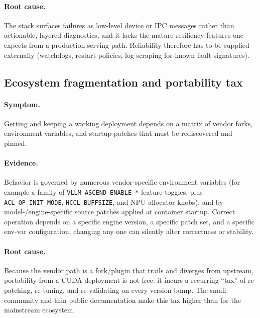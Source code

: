 \documentclass{article}
\newcommand{\code}[1]{\texttt{#1}}
\begin{document}
\paragraph{Root cause.} The stack surfaces failures as low-level device or IPC
messages rather than actionable, layered diagnostics, and it lacks the mature
resiliency features one expects from a production serving path. Reliability
therefore has to be supplied externally (watchdogs, restart policies, log scraping
for known fault signatures).

\subsection{Ecosystem fragmentation and portability tax}
\label{sec:ecosystem}
\paragraph{Symptom.} Getting and keeping a working deployment depends on a matrix
of vendor forks, environment variables, and startup patches that must be
rediscovered and pinned.

\paragraph{Evidence.} Behavior is governed by numerous vendor-specific environment
variables (for example a family of \code{VLLM\_ASCEND\_ENABLE\_*} feature toggles,
plus \code{ACL\_OP\_INIT\_MODE}, \code{HCCL\_BUFFSIZE}, and NPU allocator knobs),
and by model-/engine-specific source patches applied at container startup. Correct
operation depends on a specific engine version, a specific patch set, and a
specific env-var configuration; changing any one can silently alter correctness or
stability.

\paragraph{Root cause.} Because the vendor path is a fork/plugin that trails and
diverges from upstream, portability from a CUDA deployment is not free: it incurs a
recurring ``tax'' of re-patching, re-tuning, and re-validating on every version
bump. The small community and thin public documentation make this tax higher than
for the mainstream ecosystem.

\end{document}
